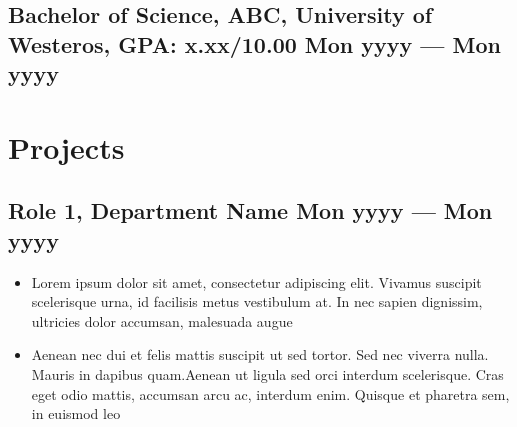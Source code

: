 \documentclass[a4,10pt]{article}
\newenvironment{zitemize}{
\begin{itemize}\itemsep0pt \parskip0pt \parsep1pt}
{\end{itemize}\vspace{-0.5cm}}
\begin{document}
\subsection*{Bachelor of Science, ABC, {\normalsize \normalfont University of Westeros, GPA: x.xx/10.00} \hfill Mon yyyy --- Mon yyyy} 
\vspace{0.2cm}

\section{Projects} %



\subsection*{Role 1, {\normalsize\normalfont Department Name} \hfill Mon yyyy --- Mon yyyy} 
    \begin{zitemize}
        \item Lorem ipsum dolor sit amet, consectetur adipiscing elit. Vivamus suscipit scelerisque urna, id facilisis metus vestibulum at. In nec sapien dignissim, ultricies dolor accumsan, malesuada augue 
        \item Aenean nec dui et felis mattis suscipit ut sed tortor. Sed nec viverra nulla. Mauris in dapibus quam.Aenean ut ligula sed orci interdum scelerisque. Cras eget odio mattis, accumsan arcu ac, interdum enim. Quisque et pharetra sem, in euismod leo 
    \end{zitemize}


\end{document}
